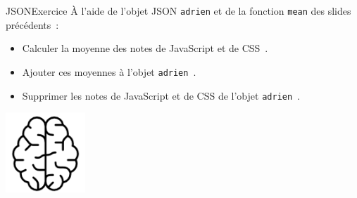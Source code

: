 \documentclass{beamer}
\begin{document}
    \begin{frame}{JSON}{Exercice \execcounterdispinc{}}
        À l'aide de l'objet JSON \lstinline{adrien} et de la fonction \lstinline{mean} des slides précédents~:
        \begin{itemize}
            \item Calculer la moyenne des notes de JavaScript et de CSS~.
            \item Ajouter ces moyennes à l'objet \lstinline{adrien}~.
            \item Supprimer les notes de JavaScript et de CSS de l'objet \lstinline{adrien}~.
        \end{itemize}
        \bigbreak
        \centering
        \includegraphics[width=3cm]{image/intelligence}
    \end{frame}
\end{document}
